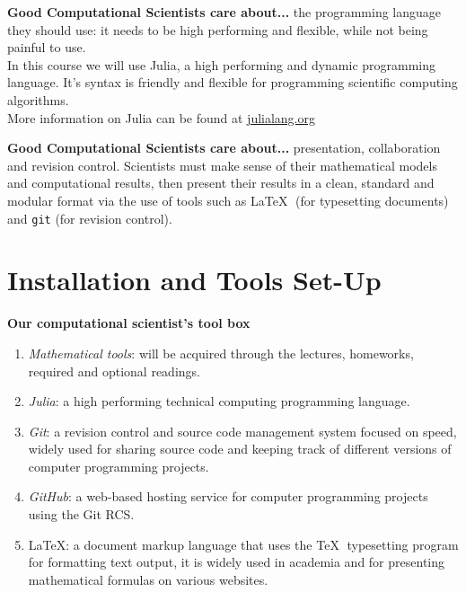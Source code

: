 \documentclass[xcolor=dvipsnames]{beamer}
\begin{document}
\begin{frame}
{\bf Good Computational Scientists care about...}
the programming language they should use: it needs to be high performing and flexible, while not being painful to use.\\
\vfill
\pause
In this course we will use Julia, a high performing and dynamic programming language. It's syntax is friendly and flexible for programming scientific computing algorithms.\\
\vfill
\pause
More information on Julia can be found at \href{http://julialang.org/}{julialang.org}\\
\end{frame}

\begin{frame}[fragile]
{\bf Good Computational Scientists care about...}
presentation, collaboration and revision control.
\vfill
\pause
Scientists must make sense of their mathematical models and computational results, then present their results in a clean, standard and modular format via the use of tools such as \LaTeX $\;$ (for typesetting documents) and \verb+git+ (for revision control).
\end{frame}

\section{Installation and Tools Set-Up}
\begin{frame}[fragile]
{\bf Our computational scientist's tool box}
\begin{enumerate}
\item {\it\large Mathematical tools}: will be acquired through the lectures, homeworks, required and optional readings.
\pause
\item {\it\large Julia}: a high performing technical computing programming language.
\pause
\item {\it\large Git}: a revision control and source code management system focused on speed, widely used for sharing source code and keeping track of different versions of computer programming projects.
\pause
\item {\it\large GitHub}: a web-based hosting service for computer programming projects using the Git RCS. 
\pause
\item \LaTeX: a document markup language that uses the \TeX $\;$ typesetting program for formatting text output, it is widely used in academia and for presenting mathematical formulas on various websites. 
\end{enumerate}
\end{frame}
\end{document}
